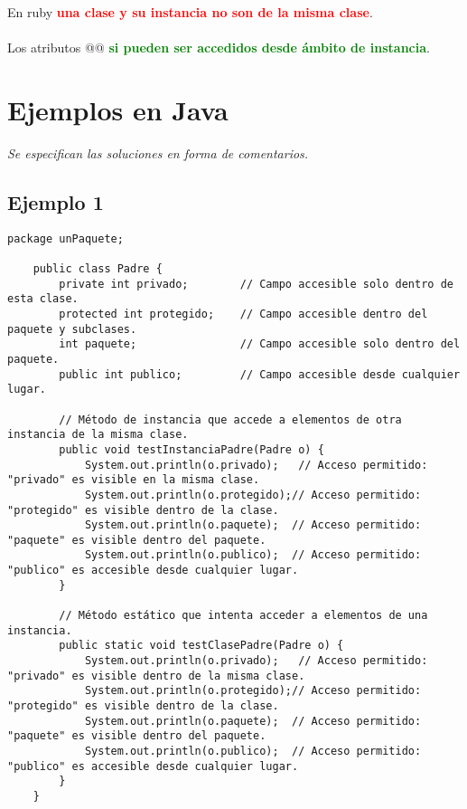 \documentclass[a4paper,12pt]{article}
\newcommand{\textorojo}[1]{\textbf{\textcolor{red}{#1}}}
\newcommand{\textoverde}[1]{\textbf{\textcolor{green}{#1}}}
\begin{document}
En ruby \textorojo{una clase y su instancia no son de la misma clase}. \\\\
Los atributos @@ \textoverde{si pueden ser accedidos desde ámbito de instancia}.

\section{Ejemplos en Java} 

\textit{Se especifican las soluciones en forma de comentarios.
}

\subsection{Ejemplo 1}

\begin{lstlisting}[style=customjava]
    package unPaquete;
    
    public class Padre {
        private int privado;        // Campo accesible solo dentro de esta clase.
        protected int protegido;    // Campo accesible dentro del paquete y subclases.
        int paquete;                // Campo accesible solo dentro del paquete.
        public int publico;         // Campo accesible desde cualquier lugar.
    
        // Método de instancia que accede a elementos de otra instancia de la misma clase.
        public void testInstanciaPadre(Padre o) {
            System.out.println(o.privado);   // Acceso permitido: "privado" es visible en la misma clase.
            System.out.println(o.protegido);// Acceso permitido: "protegido" es visible dentro de la clase.
            System.out.println(o.paquete);  // Acceso permitido: "paquete" es visible dentro del paquete.
            System.out.println(o.publico);  // Acceso permitido: "publico" es accesible desde cualquier lugar.
        }
    
        // Método estático que intenta acceder a elementos de una instancia.
        public static void testClasePadre(Padre o) {
            System.out.println(o.privado);   // Acceso permitido: "privado" es visible dentro de la misma clase.
            System.out.println(o.protegido);// Acceso permitido: "protegido" es visible dentro de la clase.
            System.out.println(o.paquete);  // Acceso permitido: "paquete" es visible dentro del paquete.
            System.out.println(o.publico);  // Acceso permitido: "publico" es accesible desde cualquier lugar.
        }
    }
    \end{lstlisting}
\end{document}
